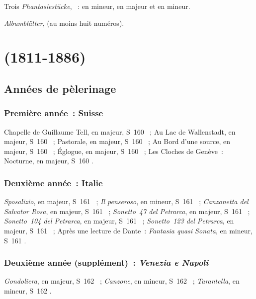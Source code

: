 Trois \emph{Phantasiestücke}, ~:  en \kC mineur,
 en \kA \Flat majeur et  en \kC mineur.

\emph{Albumblätter},  (au moins huit numéros).

\section[%
Ferenc Liszt (1811-1886)]{%
\FLiszt{} (1811-1886)}

\subsection{Années de pèlerinage}

\subsubsection{Première année~: Suisse}

Chapelle de Guillaume Tell, en \kC majeur, S~160 ~; Au Lac de
Wallenstadt, en \kA \Flat majeur, S~160 ~; Pastorale, en \kE
majeur, S~160 ~; Au Bord d'une source, en \kA \Flat majeur, S~160
~; Églogue, en \kA \Flat majeur, S~160 ~; Les Cloches de
Genève~: Nocturne, en \kB majeur, S~160 .

\subsubsection{Deuxième année~: Italie}

\emph{Sposalizio}, en \kE majeur, S~161 ~; \emph{Il penseroso}, en
\kC \Sharp mineur, S~161 ~; \emph{Canzonetta del Salvator Rosa},
en \kA majeur, S~161 ~; \emph{Sonetto~47 del Petrarca}, en \kD
\Flat majeur, S~161 ~; \emph{Sonetto~104 del Petrarca}, en \kE
majeur, S~161 ~; \emph{Sonetto~123 del Petrarca}, en \kA \Flat
majeur, S~161 ~; Après une lecture de Dante~: \emph{Fantasia quasi
Sonata}, en \kD mineur, S~161 .

\subsubsection{Deuxième année (supplément)~: \emph{Venezia e Napoli}}

\emph{Gondoliera}, en \kF \Sharp majeur, S~162 ~; \emph{Canzone},
en \kE \Flat mineur, S~162 ~; \emph{Tarantella}, en \kG mineur,
S~162 .

